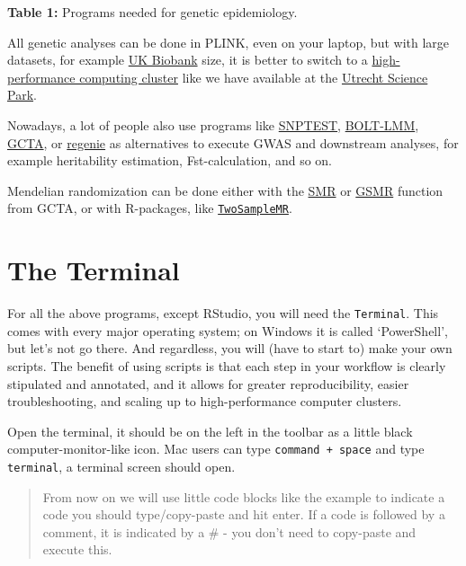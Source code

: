 \documentclass[
]{book}
\begin{document}
\textbf{Table 1:} Programs needed for genetic epidemiology.

All genetic analyses can be done in PLINK, even on your laptop, but with large datasets, for example \href{https://www.ukbiobank.ac.uk}{UK Biobank} size, it is better to switch to a \href{https://en.wikipedia.org/wiki/High-performance_computing}{high-performance computing cluster} like we have available at the \href{https://wiki.bioinformatics.umcutrecht.nl/bin/view/HPC/WebHome}{Utrecht Science Park}.

Nowadays, a lot of people also use programs like \href{snptest}{SNPTEST}, \href{https://data.broadinstitute.org/alkesgroup/BOLT-LMM/}{BOLT-LMM}, \href{http://cnsgenomics.com/software/gcta/\#Overview}{GCTA}, or \href{https://rgcgithub.github.io/regenie/}{regenie} as alternatives to execute GWAS and downstream analyses, for example heritability estimation, Fst-calculation, and so on.

Mendelian randomization can be done either with the \href{http://cnsgenomics.com/software/smr/\#Overview}{SMR} or \href{http://cnsgenomics.com/software/gsmr/}{GSMR} function from GCTA, or with R-packages, like \href{https://mrcieu.github.io/TwoSampleMR/}{\texttt{TwoSampleMR}}.

\hypertarget{the-terminal}{%
\section{The Terminal}\label{the-terminal}}

For all the above programs, except RStudio, you will need the \texttt{Terminal}. This comes with every major operating system; on Windows it is called `PowerShell', but let's not go there. And regardless, you will (have to start to) make your own scripts. The benefit of using scripts is that each step in your workflow is clearly stipulated and annotated, and it allows for greater reproducibility, easier troubleshooting, and scaling up to high-performance computer clusters.

Open the terminal, it should be on the left in the toolbar as a little black computer-monitor-like icon.
Mac users can type \texttt{command\ +\ space} and type \texttt{terminal}, a terminal screen should open.

\begin{quote}
From now on we will use little code blocks like the example to indicate a code you should type/copy-paste and hit enter. If a code is followed by a comment, it is indicated by a \# - you don't need to copy-paste and execute this.
\end{quote}
\end{document}
